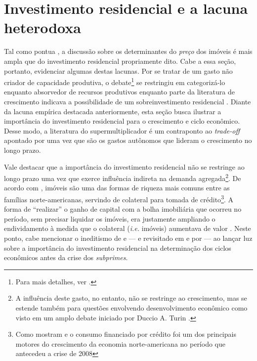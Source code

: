 \section{Investimento residencial e a lacuna heterodoxa}
\label{Secao_Residencial}

Tal como pontua \textcite{dipasquale_why_1999}, a discussão sobre os determinantes do \textit{preço} dos imóveis é mais ampla que do investimento residencial propriamente dito. Cabe a essa seção, portanto, evidenciar algumas destas lacunas.
Por se tratar de um gasto não criador de capacidade produtiva, o debate\footnote{Para mais detalhes, ver \textcite{arku_housing_2006}.} se restringiu em categorizá-lo enquanto absorvedor de recursos produtivos \cite{solow_importance_1995} enquanto parte da literatura de crescimento indicava  a possibilidade de um sobreinvestimento residencial \cite{mills_has_1987}. 
Diante da lacuna empírica destacada anteriormente, esta seção busca ilustrar a importância do investimento residencial para o crescimento e ciclo econômico. 
Desse modo, a literatura do supermultiplicador é um contraponto ao \textit{trade-off} apontado por \textcite{solow_importance_1995} uma vez que são os gastos autônomos que lideram o crescimento no longo prazo.
  

Vale destacar que a importância do investimento residencial não se restringe ao longo prazo uma vez que exerce influência indireta na demanda agregada\footnote{
	A influência deste gasto, no entanto, não se restringe ao crescimento, mas se estende também para questões envolvendo desenvolvimento econômico como visto em um amplo debate iniciado por Duccio A. Turin \cite{pheng_revisit_1992}.}. 
De acordo com \textcite{teixeira_uma_2011}, imóveis são uma das formas de riqueza mais comuns entre as famílias norte-americanas, servindo de colateral para tomada de crédito\footnote{Como mostram \textcite{zezza_u.s._2008} e \textcite{barba_rising_2009} o consumo financiado por crédito foi um dos principais motores do crescimento da economia norte-americana no período que antecedeu a crise de 2008}. A forma de ``realizar'' o ganho de capital com a bolha imobiliária que ocorreu no período, sem precisar liquidar os imóveis, era justamente ampliando o endividamento à medida que o colateral (\textit{i.e.} imóveis) aumentava de valor \cite{teixeira_crescimento_2015}. Neste ponto, cabe mencionar o ineditismo de \textcite{green_follow_1997} e \textcite{leamer_housing_2007} --- e revisitado em \textcite{leamer_housing_2015} e por \textcite{fiebiger_trend_2017} --- ao lançar luz sobre a importância do investimento residencial na determinação dos ciclos econômicos antes da crise dos \textit{subprimes}. 


